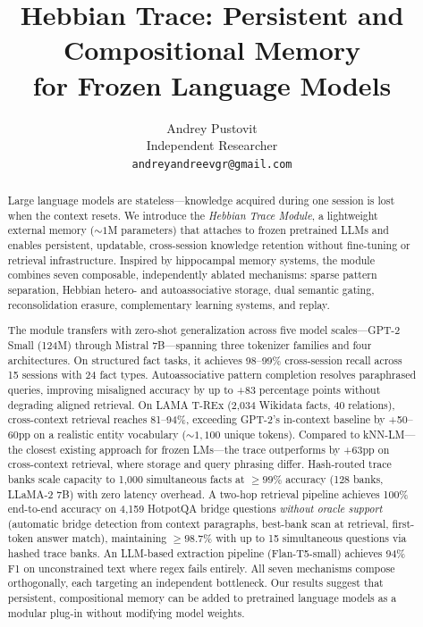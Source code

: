 \documentclass[11pt,a4paper]{article}
\title{Hebbian Trace: Persistent and Compositional Memory\\for Frozen Language Models}
\author{
  Andrey Pustovit\\
  Independent Researcher\\
  \texttt{andreyandreevgr@gmail.com}
}
\date{}
\begin{document}
\maketitle

\begin{abstract}
Large language models are stateless---knowledge acquired during one session is lost when the context resets. We introduce the \emph{Hebbian Trace Module}, a lightweight external memory (${\sim}1$M parameters) that attaches to frozen pretrained LLMs and enables persistent, updatable, cross-session knowledge retention without fine-tuning or retrieval infrastructure. Inspired by hippocampal memory systems, the module combines seven composable, independently ablated mechanisms: sparse pattern separation, Hebbian hetero- and autoassociative storage, dual semantic gating, reconsolidation erasure, complementary learning systems, and replay.

The module transfers with zero-shot generalization across five model scales---GPT-2 Small (124M) through Mistral 7B---spanning three tokenizer families and four architectures. On structured fact tasks, it achieves 98--99\% cross-session recall across 15 sessions with 24 fact types. Autoassociative pattern completion resolves paraphrased queries, improving misaligned accuracy by up to +83 percentage points without degrading aligned retrieval. On LAMA T-REx (2,034 Wikidata facts, 40 relations), cross-context retrieval reaches 81--94\%, exceeding GPT-2's in-context baseline by +50--60pp on a realistic entity vocabulary (${\sim}1{,}100$ unique tokens). Compared to kNN-LM---the closest existing approach for frozen LMs---the trace outperforms by +63pp on cross-context retrieval, where storage and query phrasing differ. Hash-routed trace banks scale capacity to 1,000 simultaneous facts at ${\geq}99\%$ accuracy (128 banks, LLaMA-2 7B) with zero latency overhead. A two-hop retrieval pipeline achieves 100\% end-to-end accuracy on 4,159 HotpotQA bridge questions \emph{without oracle support} (automatic bridge detection from context paragraphs, best-bank scan at retrieval, first-token answer match), maintaining ${\geq}98.7\%$ with up to 15 simultaneous questions via hashed trace banks. An LLM-based extraction pipeline (Flan-T5-small) achieves 94\% F1 on unconstrained text where regex fails entirely. All seven mechanisms compose orthogonally, each targeting an independent bottleneck. Our results suggest that persistent, compositional memory can be added to pretrained language models as a modular plug-in without modifying model weights.
\end{abstract}
\end{document}
